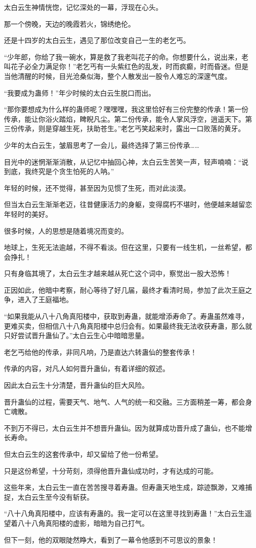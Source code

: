 \begin{this_body}
太白云生神情恍惚，记忆深处的一幕，浮现在心头。

那一个傍晚，天边的晚霞若火，锦绣绝伦。

还是十四岁的太白云生，遇见了那位改变自己一生的老乞丐。

“少年郎，你给了我一碗水，算是救了我老叫花子的命。你想要什么，说出来，老叫花子必全力满足你！”老乞丐有一头紫红色的乱发，时而疯癫，时而昏迷。但是当他清醒的时候，目光沧桑似海，整个人散发出一股令人难忘的深邃气度。

“我要成为蛊师！”年少时候的太白云生脱口而出。

“那你要想成为什么样的蛊师呢？嘿嘿嘿，我这里恰好有三份完整的传承！第一份传承，能让你浴火踏焰，睥睨凡尘。第二份传承，能令人掌风浮空，逍遥天下。第三份传承，则是穿越生死，扶助苍生。”老乞丐笑起来时，露出一口败落的黄牙。

少年的太白云生，皱眉思考了一会儿，最终选择了第三份传承……

目光中的迷惘渐渐消散，从记忆中抽回心神，太白云生苦笑一声，轻声喃喃：“说到底，我终究是个贪生怕死的人呐。”

年轻的时候，还不觉得，甚至因为见惯了生死，而对此淡漠。

但当太白云生渐渐老迈，往昔健康活力的身躯，变得腐朽不堪时，他便越来越留恋年轻时的美好。

很多时候，人的思想是随着境况而变的。

地球上，生死无法逾越，不得不看淡。但在这里，只要有一线生机，一丝希望，都会挣扎！

只有身临其境了，太白云生才越来越从死亡这个词中，察觉出一股大恐怖！

正因如此，他暗中考察，耐心等待了好几届，最终才看清时局，参加了此次王庭之争，进入了王庭福地。

“如果我能从八十八角真阳楼中，获取到寿蛊，就能增添寿命了。寿蛊虽然难寻，更难买卖，但相信八十八角真阳楼中总归会有。如果最终我无法收获寿蛊，那么就只好尝试晋升蛊仙了。”太白云生心中暗暗思量。

老乞丐给他的传承，非同凡响，乃是直达六转蛊仙的整套传承！

传承的内容，对凡人如何晋升蛊仙，有着详细的叙述。

因此太白云生十分清楚，晋升蛊仙的巨大风险。

晋升蛊仙的过程，需要天气、地气、人气的统一和交融。三方面稍差一筹，都会身亡魂散。

不到万不得已，太白云生并不想晋升蛊仙。因为就算成功晋升成了蛊仙，也不能增长寿命。

但太白云生的这套传承中，却又留给了他一份希望。

只是这份希望，十分苛刻，须得他晋升蛊仙成功时，才有达成的可能。

这些年来，太白云生一直在苦苦搜寻着寿蛊。但寿蛊天地生成，踪迹飘渺，又难捕捉，太白云生至今没有斩获。

“八十八角真阳楼中，应该有寿蛊的。我一定可以在这里寻找到寿蛊！”太白云生遥望着八十八角真阳楼的虚影，暗暗为自己打气。

但下一刻，他的双眼陡然睁大，看到了一幕令他感到不可思议的景象！

\end{this_body}

